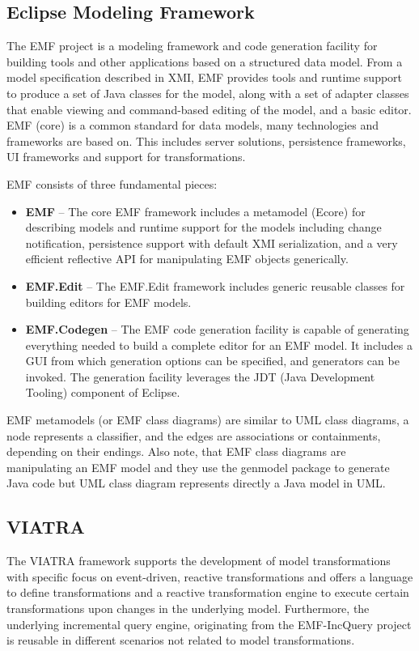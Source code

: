 \subsection{Eclipse Modeling Framework}
The EMF project is a modeling framework and code generation facility for building tools and other applications based on a structured data model. From a model specification described in XMI, EMF provides tools and runtime support to produce a set of Java classes for the model, along with a set of adapter classes that enable viewing and command-based editing of the model, and a basic editor. EMF (core) is a common standard for data models, many technologies and frameworks are based on. This includes server solutions, persistence frameworks, UI frameworks and support for transformations.

EMF consists of three fundamental pieces:
\begin{itemize}
	\item \textbf{EMF} -- The core EMF framework includes a metamodel (Ecore) for describing models and runtime support for the models including change notification, persistence support with default XMI serialization, and a very efficient reflective API for manipulating EMF objects generically.
	\item \textbf{EMF.Edit} -- The EMF.Edit framework includes generic reusable classes for building editors for EMF models.
	\item \textbf{EMF.Codegen} -- The EMF code generation facility is capable of generating everything needed to build a complete editor for an EMF model. It includes a GUI from which generation options can be specified, and generators can be invoked. The generation facility leverages the JDT (Java Development Tooling) component of Eclipse\citep{EMF}.
\end{itemize} 

EMF metamodels (or EMF class diagrams) are similar to UML class diagrams, a node represents a classifier, and the edges are associations or containments, depending on their endings.
Also note, that
EMF class diagrams are manipulating an EMF model and they use the genmodel package to generate Java code but
UML class diagram represents directly a Java model in UML.

\subsection{VIATRA}
The VIATRA framework supports the development of model transformations with specific focus on event-driven, reactive transformations and offers a language to define transformations and a reactive transformation engine to execute certain transformations upon changes in the underlying model. Furthermore, the underlying incremental query engine, originating from the EMF-IncQuery project is reusable in different scenarios not related to model transformations.\citep{VIATRA}

